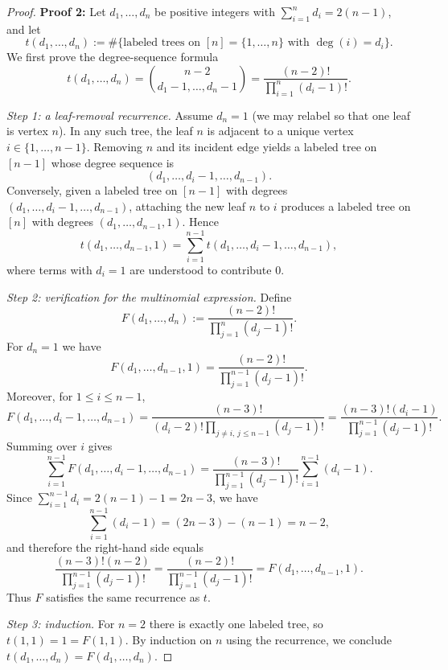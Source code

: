 \documentclass[11pt, a4paper]{ctexrep}
\begin{document}
\begin{proof}
    \textbf{Proof 2:}
    Let $d_1,\dots,d_n$ be positive integers with $\sum_{i=1}^n d_i=2(n-1)$, and let
    \[
        t(d_1,\dots,d_n):=\#\{\text{labeled trees on }[n]=\{1,\dots,n\}\text{ with }\deg(i)=d_i\}.
    \]
    We first prove the degree-sequence formula
    \[
        t(d_1,\dots,d_n)=\binom{n-2}{d_1-1,\dots,d_n-1}
        =\frac{(n-2)!}{\prod_{i=1}^n (d_i-1)!}.
        \tag{$\ast$}
    \]

    \noindent\emph{Step 1: a leaf-removal recurrence.}
    Assume $d_n=1$ (we may relabel so that one leaf is vertex $n$). In any such tree, the leaf $n$
    is adjacent to a unique vertex $i\in\{1,\dots,n-1\}$. Removing $n$ and its incident edge yields a
    labeled tree on $[n-1]$ whose degree sequence is
    \[
        (d_1,\dots,d_i-1,\dots,d_{n-1}).
    \]
    Conversely, given a labeled tree on $[n-1]$ with degrees $(d_1,\dots,d_i-1,\dots,d_{n-1})$,
    attaching the new leaf $n$ to $i$ produces a labeled tree on $[n]$ with degrees
    $(d_1,\dots,d_{n-1},1)$. Hence
    \[
        t(d_1,\dots,d_{n-1},1)=\sum_{i=1}^{n-1} t(d_1,\dots,d_i-1,\dots,d_{n-1}),
        \tag{R}
    \]
    where terms with $d_i=1$ are understood to contribute $0$.

    \noindent\emph{Step 2: verification for the multinomial expression.}
    Define
    \[
        F(d_1,\dots,d_n):=\frac{(n-2)!}{\prod_{j=1}^n (d_j-1)!}.
    \]
    For $d_n=1$ we have
    \[
        F(d_1,\dots,d_{n-1},1)=\frac{(n-2)!}{\prod_{j=1}^{n-1}(d_j-1)!}.
    \]
    Moreover, for $1\le i\le n-1$,
    \[
        F(d_1,\dots,d_i-1,\dots,d_{n-1})
        =\frac{(n-3)!}{(d_i-2)!\prod_{j\ne i,\, j\le n-1}(d_j-1)!}
        =\frac{(n-3)!(d_i-1)}{\prod_{j=1}^{n-1}(d_j-1)!}.
    \]
    Summing over $i$ gives
    \[
        \sum_{i=1}^{n-1}F(d_1,\dots,d_i-1,\dots,d_{n-1})
        =\frac{(n-3)!}{\prod_{j=1}^{n-1}(d_j-1)!}\sum_{i=1}^{n-1}(d_i-1).
    \]
    Since $\sum_{i=1}^{n-1} d_i = 2(n-1)-1=2n-3$, we have
    \[
        \sum_{i=1}^{n-1}(d_i-1)=(2n-3)-(n-1)=n-2,
    \]
    and therefore the right-hand side equals
    \[
        \frac{(n-3)!(n-2)}{\prod_{j=1}^{n-1}(d_j-1)!}
        =\frac{(n-2)!}{\prod_{j=1}^{n-1}(d_j-1)!}
        =F(d_1,\dots,d_{n-1},1).
    \]
    Thus $F$ satisfies the same recurrence as $t$.

    \noindent\emph{Step 3: induction.}
    For $n=2$ there is exactly one labeled tree, so $t(1,1)=1=F(1,1)$. By induction on $n$ using
    the recurrence, we conclude $t(d_1,\dots,d_n)=F(d_1,\dots,d_n)$.


\end{proof}
\end{document}
